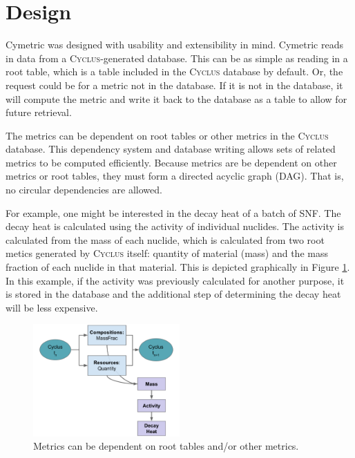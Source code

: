 \documentclass{anstrans}
\newcommand{\cyclus}{\textsc{Cyclus}\xspace}
\begin{document}
\section{Design}
Cymetric was designed with usability and extensibility in mind. 
Cymetric reads in data from a \cyclus{}-generated database. This can be as 
simple as reading in a root table, which is a table included in the \cyclus 
database by default. Or, the request could be for a metric not in the database.
If it is not in the database, it will compute the metric and 
write it back to the database as a table to allow for future retrieval. 

The metrics can be dependent on root tables or other metrics in the
\cyclus database. This dependency system and database writing allows sets of 
related metrics to be computed efficiently. Because metrics are be dependent on other metrics or root tables, they must form a directed 
acyclic graph (DAG). That is, no circular dependencies are allowed.

For example, one might be interested in the decay heat 
of a batch of \gls{SNF}. The decay heat is calculated using the activity of 
individual nuclides. The activity is calculated from the mass of each nuclide, which 
is calculated from two root metics generated by  \cyclus itself: quantity of 
material (mass) and the mass fraction of each nuclide in that material. 
This is depicted graphically in Figure \ref{fig:metdeps}. In this example, 
if the activity was previously calculated for another purpose, it is stored in the database and the additional step of 
determining the decay heat will be less expensive. 

\begin{figure}[htbp!]
\begin{center}
\includegraphics[width=0.5\textwidth]{deps.pdf}
\end{center}
\caption{Metrics can be dependent on root tables and/or other metrics.}
\label{fig:metdeps}
\end{figure}
\end{document}
